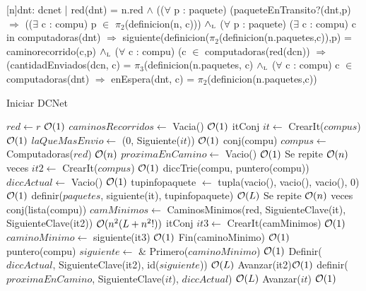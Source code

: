 \begin{Representacion}
 
  [n]{dnt: dcnet | red(dnt) = n.red  $\land$ (($\forall$ p : paquete) (paqueteEnTransito?(dnt,p) $\Rightarrow$ (($\exists$ c : compu) p $\in$ $\pi_2$(definicion(n, c))) $\land_{\mathrm{\scriptscriptstyle{L}}}$
 ($\forall$ p : paquete) ($\exists$ c : compu) c in computadoras(dnt) $\Rightarrow$ siguiente(definicion($\pi_2$(definicion(n.paquetes,c)),p) = caminorecorrido(c,p)  $\land_{\mathrm{\scriptscriptstyle{L}}}$
($\forall$ c : compu) (c $\in$ computadoras(red(dcn)) $\Rightarrow$ (cantidadEnviados(dcn, c) = $\pi_3$(definicion(n.paquetes, c) $\land_{\mathrm{\scriptscriptstyle{L}}}$ 
($\forall$ c : compu) c $\in$ computadoras(dnt) $\Rightarrow$ enEspera(dnt, c) = $\pi_2$(definicion(n.paquetes,c))}

\end{Representacion}



\begin{Algoritmos}


\begin{algorithm}
\caption{Iniciar DCNet}
\begin{algorithmic}[1]
  \State $red \gets r$ \Comment $\mathcal{O}(1)$
  \State $caminosRecorridos \gets$ Vacia() \Comment $\mathcal{O}(1)$ 
  \State itConj $it \gets$ CrearIt($compus$) \Comment $\mathcal{O}(1)$
  \State $laQueMasEnvio \gets$ (0, Siguiente($it$)) \Comment $\mathcal{O}(1)$
  \State conj(compu) $compus \gets$ Computadoras($red$) \Comment $\mathcal{O}(n)$
  \State $proximaEnCamino \gets$ Vacio() \Comment $\mathcal{O}(1)$
   \Comment Se repite $\mathcal{O}(n)$ veces
    \State {} $it2 \gets$ CrearIt($compus$) \Comment $\mathcal{O}(1)$
    \State diccTrie(compu, puntero(compu)) $diccActual \gets$ Vacio() \Comment $\mathcal{O}(1)$
	\State {} tupinfopaquete $\gets$ tupla(vacio(), vacio(), vacio(), 0) \Comment $\mathcal{O}(1)$	
	\State definir($paquetes$, siguiente(it), tupinfopaquete) \Comment $\mathcal{O}(L)$
     \Comment Se repite $\mathcal{O}(n)$ veces
      \State conj(lista(compu)) $camMinimos \gets$ CaminosMinimos(red, SiguienteClave(it), SiguienteClave(it2)) \Comment $\mathcal{O}(n^2(L + n^2!))$
      \State itConj $it3 \gets$ CrearIt(camMinimos) \Comment $\mathcal{O}(1)$
      \State $caminoMinimo \gets$ siguiente(it3) \Comment $\mathcal{O}(1)$
      \State Fin(caminoMinimo) \Comment $\mathcal{O}(1)$
      \State puntero(compu) $siguiente \gets$ \& Primero($caminoMinimo$) \Comment $\mathcal{O}(1)$
      \State Definir($diccActual$, SiguienteClave(it2), id($siguiente$)) \Comment $\mathcal{O}(L)$
      \State Avanzar(it2)\Comment $\mathcal{O}(1)$
    \EndWhile
    \State definir($proximaEnCamino$, SiguienteClave($it$), $diccActual$) \Comment $\mathcal{O}(L)$
    \State Avanzar($it$) \Comment $\mathcal{O}(1)$
  \EndWhile
   

\end{algorithmic}
\end{algorithm}
\end{Algoritmos}
